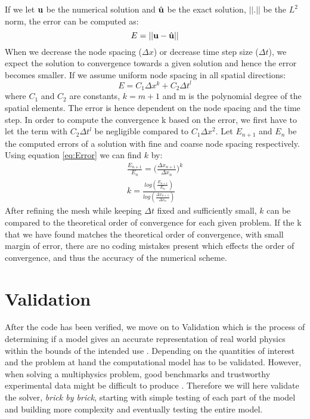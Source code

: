 If we let $\bold{u}$ be the numerical solution and $\hat{\bold{u}}$ be the exact solution, $|| . ||$ be the $L^2$ norm, the error can be computed as:
\begin{equation}
E = || \bold{u} - \hat{\bold{u}} ||
\end{equation}
When we decrease the node spacing ($ \Delta x $) or decrease time step size ($\Delta t$), we expect the solution to convergence towards a given solution and hence the error becomes smaller. If we assume uniform node spacing in all spatial directions: 
\begin{equation}
\label{eq:Error}
 E = C_1 \Delta x^k+ C_2 \Delta t^l 
\end{equation}
where $C_1$ and $C_2$ are constants, $ k = m+1 $ and m is the polynomial degree of the spatial elements. The error is hence dependent on the node spacing and the time step.
In order to compute the convergence k  based on the error, we first have to let the term with $C_2\Delta t^l$ be negligible compared to $C_1\Delta x^2$. 
Let $E_{n+1}$ and $E_{n}$ be the computed errors of a solution with fine and coarse node spacing respectively.
Using equation \eqref{eq:Error} we can find $k$ by:
\begin{align}
\frac{E_{n+1}}{E_n} = \big( \frac{\Delta x_{n+1}}{\Delta x_n} \big)^k \\
k = \frac{log( \frac{E_{n+1}}{E_n}) }{ log(\frac{\Delta x_{n+1}}{\Delta x_n})}
\end{align}
After refining the mesh while keeping $\Delta t $ fixed and sufficiently small,
$k$ can be compared to the theoretical order of convergence for each given problem. If the k that we have found matches the theoretical order of convergence, with small margin of error, there are no coding mistakes present which effects the order of convergence, and thus the accuracy of the numerical scheme. \newline




\section{Validation}
After the code has been verified, we move on to Validation which is the process of determining if a model gives an accurate representation of real world physics within the bounds of the intended use \cite{oberkampf2008verification}. Depending on the quantities of interest and the problem at hand the computational model has to be validated. However, when solving a multiphysics problem, good benchmarks and trustworthy experimental data might be difficult to produce \cite{Macal2005}. Therefore we will here validate the solver, \textsl{brick by brick}, starting with simple testing of each part of the model and building more complexity and eventually testing the entire model.\newline

